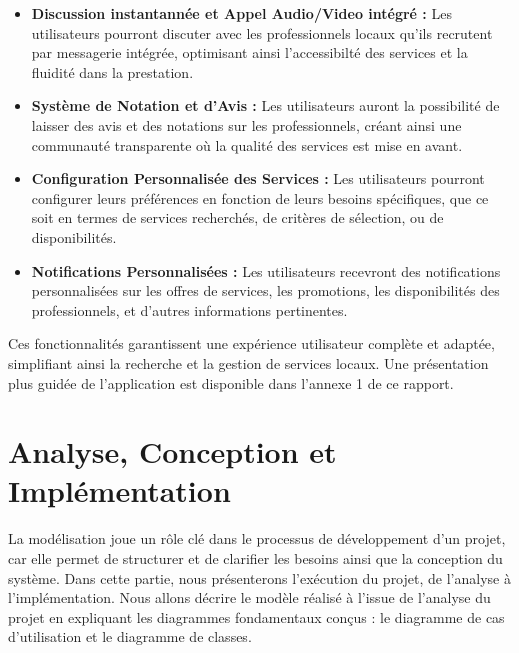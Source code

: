 {\begin{itemize}
    \item \textbf{Discussion instantannée et Appel Audio/Video intégré :} Les utilisateurs pourront discuter avec les professionnels locaux qu'ils recrutent par messagerie intégrée, optimisant ainsi l'accessibilté des services et la fluidité dans la prestation.

    \item \textbf{Système de Notation et d'Avis :} Les utilisateurs auront la possibilité de laisser des avis et des notations sur les professionnels, créant ainsi une communauté transparente où la qualité des services est mise en avant.

    \item \textbf{Configuration Personnalisée des Services :} Les utilisateurs pourront configurer leurs préférences en fonction de leurs besoins spécifiques, que ce soit en termes de services recherchés, de critères de sélection, ou de disponibilités.

    \item \textbf{Notifications Personnalisées :} Les utilisateurs recevront des notifications personnalisées sur les offres de services, les promotions, les disponibilités des professionnels, et d'autres informations pertinentes.

\end{itemize}

\vspace{0.5cm}

Ces fonctionnalités garantissent une expérience utilisateur complète et adaptée, simplifiant ainsi la recherche et la gestion de services locaux. Une présentation plus guidée de l'application est disponible dans l'annexe 1 de ce rapport.

\chapter{Analyse, Conception et Implémentation}

La modélisation joue un rôle clé dans le processus de développement d'un projet, car elle permet de structurer et de clarifier les besoins ainsi que la conception du système. Dans cette partie, nous présenterons l'exécution du projet, de l'analyse à l'implémentation. Nous allons décrire le modèle réalisé à l'issue de l'analyse du projet en expliquant les diagrammes fondamentaux conçus : le diagramme de cas d'utilisation et le diagramme de classes.

\vspace{0.35cm}

}
